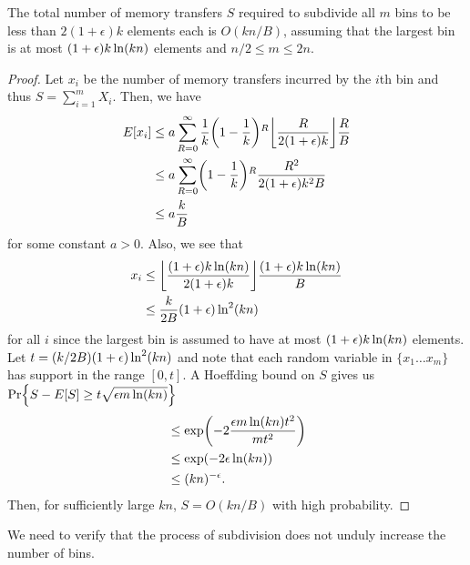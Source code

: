 \begin{theorem}
  The total number of memory transfers $S$ required to subdivide all $m$ bins to be less
  than $2(1+\epsilon)k$ elements each is $O(kn/B)$, assuming that the largest bin is at most 
  $(1+\epsilon)k\ln \mathopen{}\left(kn\right)\mathclose{}$ elements and $n/2 \leq m \leq 2n$.
\end{theorem}
\begin{proof}
  Let $x_i$ be the number of memory transfers incurred by the $i$th bin and
  thus $S=\sum_{i=1}^{m}X_i$.  Then, we have 
  \begin{align*}
    E[x_i] & \leq a \sum_{R=0}^{\infty} \frac{1}{k}\mathopen{}\left(1-\frac{1}{k}\right)\mathclose{}^R \mathopen{}\left\lfloor \frac{R}{2(1+\epsilon)k} \right\rfloor\mathclose{} \frac{R}{B}\\
    & \leq a \sum_{R=0}^{\infty} \mathopen{}\left(1-\frac{1}{k}\right)\mathclose{}^R \frac{R^2}{2(1+\epsilon)k^2B}\\
    & \leq a\frac{k}{B}\\
  \end{align*}
  for some constant $a>0$.
  Also, we see that
  \begin{align*}
    x_i &\leq \mathopen{}\left\lfloor \frac{(1+\epsilon)k\ln \mathopen{}\left(kn\right)\mathclose{}}{2(1+\epsilon)k} \right\rfloor\mathclose{}\frac{(1+\epsilon)k\ln \mathopen{}\left(kn\right)\mathclose{}}{B}\\
    &\leq \frac{k}{2B}(1+\epsilon) \ln ^2 \mathopen{}\left(kn\right)\mathclose{} \\
  \end{align*}
  for all $i$ since the largest bin is assumed to have at most 
  $(1+\epsilon)k\ln \mathopen{}\left(kn\right)\mathclose{}$ elements.  
  Let $t = \mathopen{}\left(k/2B\right)\mathclose{}(1+\epsilon) \ln ^2 \mathopen{}\left(kn\right)\mathclose{}$ and note that 
  each random variable in $\{ x_1 \ldots x_m \}$ has support in the range $[0, t]$.
  A Hoeffding bound on $S$ gives us $\Pr\mathopen{}\left\{ S - E[S] \geq t \sqrt{\epsilon m \ln \mathopen{}\left(kn\right)\mathclose{}} \right\}\mathclose{}$
  \begin{align*}
    & \leq \exp \mathopen{}\left(-2\frac{\epsilon m \ln \mathopen{}\left(kn\right)\mathclose{} t^2}{mt^2}\right)\mathclose{}\\
    & \leq \exp \mathopen{}\left(-2\epsilon \ln \mathopen{}\left(kn\right)\mathclose{}\right)\mathclose{}\\
    & \leq \mathopen{}\left(kn\right)\mathclose{}^{-\epsilon}.\\
  \end{align*}
  Then, for sufficiently large $kn$, $S = O(kn/B)$ with high probability.
\end{proof}

We need to verify that the process of subdivision does not unduly increase the 
number of bins.


